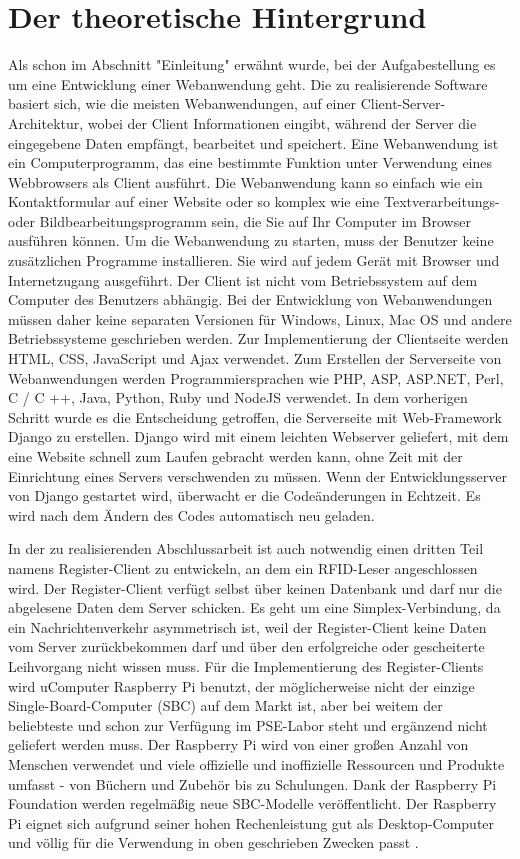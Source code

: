 \chapter{Der theoretische Hintergrund}
\label{sec:theorie}
Als schon im Abschnitt "Einleitung" erwähnt wurde, bei der Aufgabestellung es um eine Entwicklung einer Webanwendung geht. Die zu realisierende Software basiert sich, wie die meisten Webanwendungen, auf einer Client-Server-Architektur, wobei der Client Informationen eingibt, während der Server die eingegebene Daten empfängt, bearbeitet und speichert. Eine Webanwendung ist ein Computerprogramm, das eine bestimmte Funktion unter Verwendung eines Webbrowsers als Client ausführt. Die Webanwendung kann so einfach wie ein Kontaktformular auf einer Website oder so komplex wie eine Textverarbeitungs- oder Bildbearbeitungsprogramm sein, die Sie auf Ihr Computer im Browser ausführen können. Um die Webanwendung zu starten, muss der Benutzer keine zusätzlichen Programme installieren. Sie wird auf jedem Gerät mit Browser und Internetzugang ausgeführt. Der Client ist nicht vom Betriebssystem auf dem Computer des Benutzers abhängig. Bei der Entwicklung von Webanwendungen müssen daher keine separaten Versionen für Windows, Linux, Mac OS und andere Betriebssysteme geschrieben werden. Zur Implementierung der Clientseite werden HTML, CSS, JavaScript und Ajax verwendet. Zum Erstellen der Serverseite von Webanwendungen werden Programmiersprachen wie PHP, ASP, ASP.NET, Perl, C / C ++, Java, Python, Ruby und NodeJS verwendet. In dem vorherigen Schritt wurde es die Entscheidung getroffen, die Serverseite mit Web-Framework Django zu erstellen. Django wird mit einem leichten Webserver geliefert, mit dem eine  Website schnell zum Laufen gebracht werden kann, ohne Zeit mit der Einrichtung eines Servers verschwenden zu müssen. Wenn der Entwicklungsserver von Django gestartet wird, überwacht er die Codeänderungen in Echtzeit. Es wird nach dem Ändern des Codes automatisch neu geladen.

In der zu realisierenden Abschlussarbeit ist auch notwendig einen dritten Teil namens Register-Client zu entwickeln, an dem ein RFID-Leser angeschlossen wird. Der Register-Client verfügt selbst über keinen Datenbank und darf nur die abgelesene Daten dem Server schicken. Es geht um eine Simplex-Verbindung, da ein Nachrichtenverkehr asymmetrisch ist, weil der Register-Client keine Daten vom Server zurückbekommen darf und über den erfolgreiche oder gescheiterte Leihvorgang nicht wissen muss. Für die Implementierung des Register-Clients wird uComputer Raspberry Pi benutzt, der möglicherweise nicht der einzige Single-Board-Computer (SBC) auf dem Markt ist, aber bei weitem der beliebteste und schon zur Verfügung im PSE-Labor steht und ergänzend nicht geliefert werden muss. Der Raspberry Pi wird von einer großen Anzahl von Menschen verwendet und viele offizielle und inoffizielle Ressourcen und Produkte umfasst - von Büchern und Zubehör bis zu Schulungen. Dank der Raspberry Pi Foundation werden regelmäßig neue SBC-Modelle veröffentlicht. Der Raspberry Pi eignet sich aufgrund seiner hohen Rechenleistung gut als Desktop-Computer und völlig für die Verwendung in oben geschrieben Zwecken passt . 

